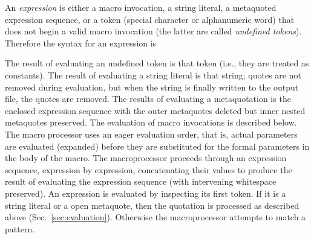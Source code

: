 \documentclass[12pt]{article}
\begin{document}
An \emph{expression} is either a macro invocation, a string literal, a metaquoted expression sequence, or a token (special character or alphanumeric word) that does not begin a valid macro invocation (the latter are called \emph{undefined tokens}).
Therefore the syntax for an expression is

The result of evaluating an undefined token is that token (i.e., they are treated as constants).
The result of evaluating a string literal is that string; quotes are not removed during evaluation, but when the string is finally written to the output file, the quotes are removed.
The results of evaluating a metaquotation is the enclosed expression sequence with the outer metaquotes deleted but inner nested metaquotes preserved.
The evaluation of macro invocations is described below.
The macro processor uses an eager evaluation order, that is, actual parameters are evaluated (expanded) before they are substituted for the formal parameters in the body of the macro.
The macroprocessor proceeds through an expression sequence, expression by expression, concatenating their values to produce the result of evaluating the expression sequence (with intervening whitespace preserved).
An expression is evaluated by inspecting its first token.
If it is a string literal or a open metaquote, then the quotation is processed as described above (Sec.\ \ref{sec:evaluation}).
Otherwise the macroprocessor attempts to match a pattern.
\end{document}
